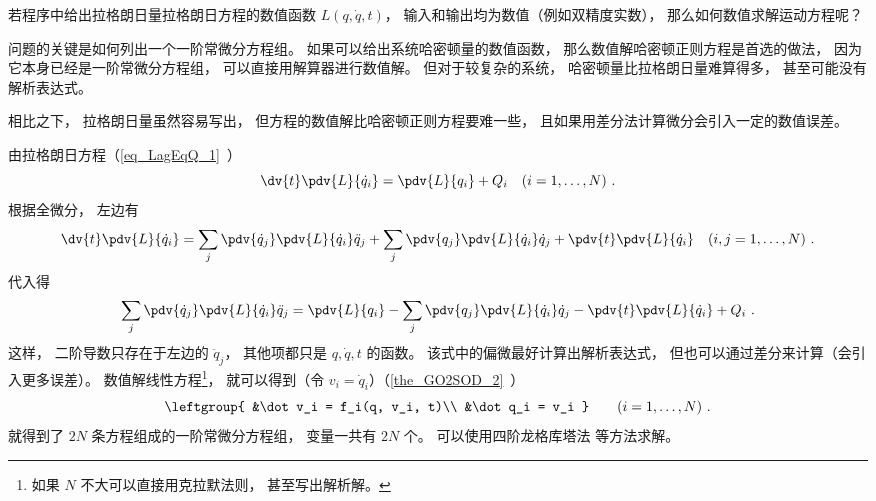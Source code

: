 
\begin{issues}
\issueDraft
\end{issues}


若程序中给出拉格朗日量拉格朗日方程的数值函数 $L(q, \dot q, t)$， 输入和输出均为数值（例如双精度实数）， 那么如何数值求解运动方程呢？

问题的关键是如何列出一个一阶常微分方程组。 如果可以给出系统哈密顿量的数值函数， 那么数值解哈密顿正则方程是首选的做法， 因为它本身已经是一阶常微分方程组， 可以直接用解算器进行数值解。 但对于较复杂的系统， 哈密顿量比拉格朗日量难算得多， 甚至可能没有解析表达式。

相比之下， 拉格朗日量虽然容易写出， 但方程的数值解比哈密顿正则方程要难一些， 且如果用差分法计算微分会引入一定的数值误差。

由拉格朗日方程（\autoref{eq_LagEqQ_1}~）
\begin{equation}
\dv{t} \pdv{L}{\dot q_i} = \pdv{L}{q_i} + Q_i
\quad (i=1,\dots,N)~.
\end{equation}
根据全微分， 左边有
\begin{equation}
\dv{t} \pdv{L}{\dot q_i} = \sum_j\pdv{\dot q_j}\pdv{L}{\dot q_i}\ddot q_j + \sum_j\pdv{q_j}\pdv{L}{\dot q_i}\dot q_j + \pdv{t}\pdv{L}{\dot q_i} \quad (i,j=1,\dots,N)~.
\end{equation}
代入得
\begin{equation}
\sum_j\pdv{\dot q_j}\pdv{L}{\dot q_i}\ddot q_j = \pdv{L}{q_i} - \sum_j\pdv{q_j}\pdv{L}{\dot q_i}\dot q_j - \pdv{t}\pdv{L}{\dot q_i} + Q_i~.
\end{equation}
这样， 二阶导数只存在于左边的 $\ddot q_j$， 其他项都只是 $q,\dot q, t$ 的函数。 该式中的偏微最好计算出解析表达式， 但也可以通过差分来计算（会引入更多误差）。 数值解线性方程\footnote{如果 $N$ 不大可以直接用克拉默法则， 甚至写出解析解。}， 就可以得到（令 $v_i = \dot q_i$）（\autoref{the_GO2SOD_2}~）
\begin{equation}
\leftgroup{
&\dot v_i = f_i(q, v_i, t)\\
&\dot q_i = v_i
}\qquad (i = 1,\dots,N)~.
\end{equation}
就得到了 $2N$ 条方程组成的一阶常微分方程组， 变量一共有 $2N$ 个。 可以使用四阶龙格库塔法 等方法求解。

